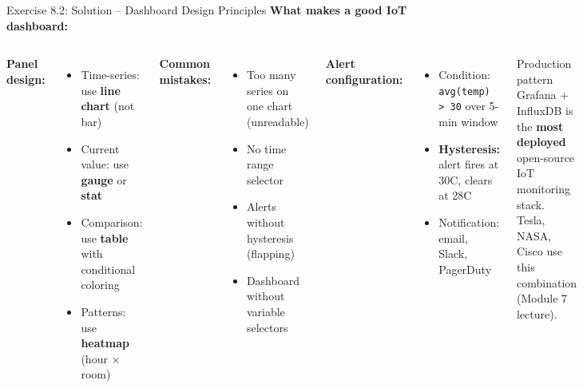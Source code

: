 \documentclass[aspectratio=169,11pt]{beamer}
\begin{document}
\begin{frame}{Exercise 8.2: Solution -- Dashboard Design Principles}
    \textbf{What makes a good IoT dashboard:}

    \vspace{0.2cm}
    \begin{columns}
        \textbf{Panel design:}
        \begin{itemize}
            \item Time-series: use \textbf{line chart} (not bar)
            \item Current value: use \textbf{gauge} or \textbf{stat}
            \item Comparison: use \textbf{table} with conditional coloring
            \item Patterns: use \textbf{heatmap} (hour $\times$ room)
        \end{itemize}

        \vspace{0.2cm}
        \textbf{Common mistakes:}
        \begin{itemize}
            \item Too many series on one chart (unreadable)
            \item No time range selector
            \item Alerts without hysteresis (flapping)
            \item Dashboard without variable selectors
        \end{itemize}

        \textbf{Alert configuration:}
        \begin{itemize}
            \item Condition: \texttt{avg(temp) > 30} over 5-min window
            \item \textbf{Hysteresis:} alert fires at 30\textdegree C, clears at 28\textdegree C
            \item Notification: email, Slack, PagerDuty
        \end{itemize}

        \vspace{0.2cm}
        \begin{alertblock}{Production pattern}
            Grafana + InfluxDB is the \textbf{most deployed} open-source IoT monitoring stack. Tesla, NASA, Cisco use this combination (Module 7 lecture).
        \end{alertblock}
    \end{columns}
\end{frame}
\end{document}
